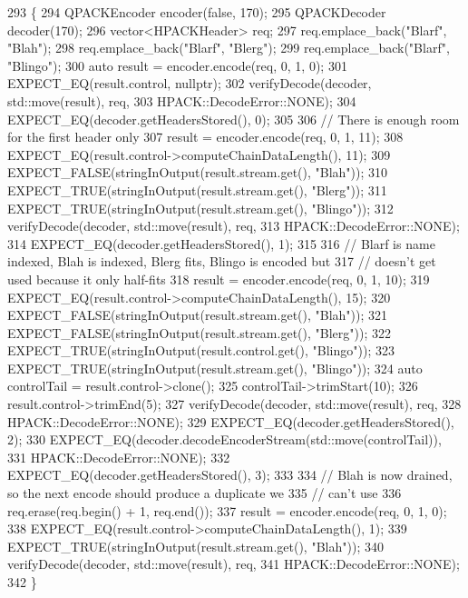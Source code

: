 \begin{DoxyCode}
293                                                 \{
294   QPACKEncoder encoder(\textcolor{keyword}{false}, 170);
295   QPACKDecoder decoder(170);
296   vector<HPACKHeader> req;
297   req.emplace\_back(\textcolor{stringliteral}{"Blarf"}, \textcolor{stringliteral}{"Blah"});
298   req.emplace\_back(\textcolor{stringliteral}{"Blarf"}, \textcolor{stringliteral}{"Blerg"});
299   req.emplace\_back(\textcolor{stringliteral}{"Blarf"}, \textcolor{stringliteral}{"Blingo"});
300   \textcolor{keyword}{auto} result = encoder.encode(req, 0, 1, 0);
301   EXPECT\_EQ(result.control, \textcolor{keyword}{nullptr});
302   verifyDecode(decoder, std::move(result), req,
303                HPACK::DecodeError::NONE);
304   EXPECT\_EQ(decoder.getHeadersStored(), 0);
305 
306   \textcolor{comment}{// There is enough room for the first header only}
307   result = encoder.encode(req, 0, 1, 11);
308   EXPECT\_EQ(result.control->computeChainDataLength(), 11);
309   EXPECT\_FALSE(stringInOutput(result.stream.get(), \textcolor{stringliteral}{"Blah"}));
310   EXPECT\_TRUE(stringInOutput(result.stream.get(), \textcolor{stringliteral}{"Blerg"}));
311   EXPECT\_TRUE(stringInOutput(result.stream.get(), \textcolor{stringliteral}{"Blingo"}));
312   verifyDecode(decoder, std::move(result), req,
313                HPACK::DecodeError::NONE);
314   EXPECT\_EQ(decoder.getHeadersStored(), 1);
315 
316   \textcolor{comment}{// Blarf is name indexed, Blah is indexed, Blerg fits, Blingo is encoded but}
317   \textcolor{comment}{// doesn't get used because it only half-fits}
318   result = encoder.encode(req, 0, 1, 10);
319   EXPECT\_EQ(result.control->computeChainDataLength(), 15);
320   EXPECT\_FALSE(stringInOutput(result.stream.get(), \textcolor{stringliteral}{"Blah"}));
321   EXPECT\_FALSE(stringInOutput(result.stream.get(), \textcolor{stringliteral}{"Blerg"}));
322   EXPECT\_TRUE(stringInOutput(result.control.get(), \textcolor{stringliteral}{"Blingo"}));
323   EXPECT\_TRUE(stringInOutput(result.stream.get(), \textcolor{stringliteral}{"Blingo"}));
324   \textcolor{keyword}{auto} controlTail = result.control->clone();
325   controlTail->trimStart(10);
326   result.control->trimEnd(5);
327   verifyDecode(decoder, std::move(result), req,
328                HPACK::DecodeError::NONE);
329   EXPECT\_EQ(decoder.getHeadersStored(), 2);
330   EXPECT\_EQ(decoder.decodeEncoderStream(std::move(controlTail)),
331             HPACK::DecodeError::NONE);
332   EXPECT\_EQ(decoder.getHeadersStored(), 3);
333 
334   \textcolor{comment}{// Blah is now drained, so the next encode should produce a duplicate we}
335   \textcolor{comment}{// can't use}
336   req.erase(req.begin() + 1, req.end());
337   result = encoder.encode(req, 0, 1, 0);
338   EXPECT\_EQ(result.control->computeChainDataLength(), 1);
339   EXPECT\_TRUE(stringInOutput(result.stream.get(), \textcolor{stringliteral}{"Blah"}));
340   verifyDecode(decoder, std::move(result), req,
341                HPACK::DecodeError::NONE);
342 \}
\end{DoxyCode}
